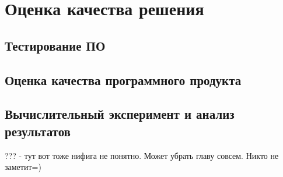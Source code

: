 \newpage
\section{Оценка качества решения}

\subsection{Тестирование ПО}



\subsection{Оценка качества программного продукта}



\subsection{Вычислительный эксперимент и анализ результатов}

??? - тут вот тоже нифига не понятно. Может убрать главу совсем. Никто не заметит=)
